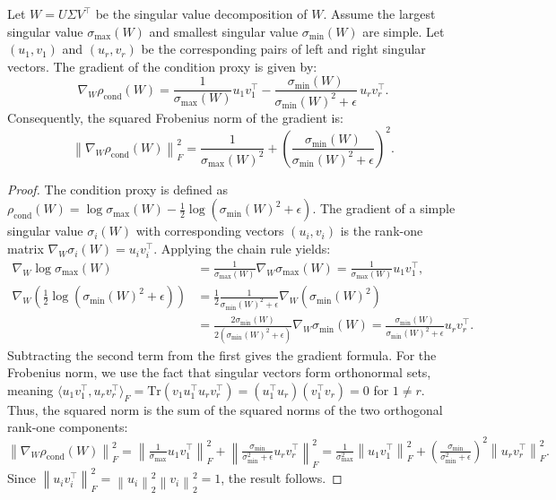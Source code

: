 \documentclass{opt2025}
\newcommand{\Tr}{\mathrm{Tr}}
\newcommand{\norm}[1]{\left\lVert #1 \right\rVert}
\begin{document}
\begin{lemma}
\label{lem:grad_form_app}
Let $W=U\Sigma V^\top$ be the singular value decomposition of $W$. Assume the largest singular value $\sigma_{\max}(W)$ and smallest singular value $\sigma_{\min}(W)$ are simple. Let $(u_1, v_1)$ and $(u_r, v_r)$ be the corresponding pairs of left and right singular vectors. The gradient of the condition proxy is given by:
\[
\nabla_W \rho_{\mathrm{cond}}(W) = \frac{1}{\sigma_{\max}(W)} u_1 v_1^\top - \frac{\sigma_{\min}(W)}{\sigma_{\min}(W)^2 + \epsilon} \, u_r v_r^\top.
\]
Consequently, the squared Frobenius norm of the gradient is:
\[
\norm{\nabla_W \rho_{\mathrm{cond}}(W)}_F^2 = \frac{1}{\sigma_{\max}(W)^2} + \left(\frac{\sigma_{\min}(W)}{\sigma_{\min}(W)^2 + \epsilon}\right)^2.
\]
\end{lemma}
\begin{proof}
The condition proxy is defined as $\rho_{\mathrm{cond}}(W) = \log\sigma_{\max}(W) - \frac{1}{2}\log(\sigma_{\min}(W)^2 + \epsilon)$. The gradient of a simple singular value $\sigma_i(W)$ with corresponding vectors $(u_i, v_i)$ is the rank-one matrix $\nabla_W \sigma_i(W) = u_i v_i^\top$. Applying the chain rule yields:
\begin{align*}
\nabla_W \log\sigma_{\max}(W) &= \frac{1}{\sigma_{\max}(W)} \nabla_W \sigma_{\max}(W) = \frac{1}{\sigma_{\max}(W)} u_1 v_1^\top, \\
\nabla_W \left(\tfrac{1}{2}\log(\sigma_{\min}(W)^2 + \epsilon)\right) &= \frac{1}{2} \frac{1}{\sigma_{\min}(W)^2 + \epsilon} \nabla_W(\sigma_{\min}(W)^2) \\
&= \frac{2\sigma_{\min}(W)}{2(\sigma_{\min}(W)^2 + \epsilon)} \nabla_W \sigma_{\min}(W) = \frac{\sigma_{\min}(W)}{\sigma_{\min}(W)^2 + \epsilon} u_r v_r^\top.
\end{align*}
Subtracting the second term from the first gives the gradient formula. For the Frobenius norm, we use the fact that singular vectors form orthonormal sets, meaning $\langle u_1v_1^\top, u_rv_r^\top \rangle_F = \Tr(v_1u_1^\top u_rv_r^\top) = (u_1^\top u_r)(v_1^\top v_r) = 0$ for $1 \neq r$. Thus, the squared norm is the sum of the squared norms of the two orthogonal rank-one components:
\[
\norm{\nabla_W \rho_{\mathrm{cond}}(W)}_F^2 = \norm{\tfrac{1}{\sigma_{\max}} u_1 v_1^\top}_F^2 + \norm{\tfrac{\sigma_{\min}}{\sigma_{\min}^2+\epsilon} u_r v_r^\top}_F^2 = \tfrac{1}{\sigma_{\max}^2}\norm{u_1 v_1^\top}_F^2 + \left(\tfrac{\sigma_{\min}}{\sigma_{\min}^2+\epsilon}\right)^2\norm{u_r v_r^\top}_F^2.
\]
Since $\norm{u_iv_i^\top}_F^2 = \norm{u_i}_2^2\norm{v_i}_2^2 = 1$, the result follows.
\end{proof}
\end{document}
